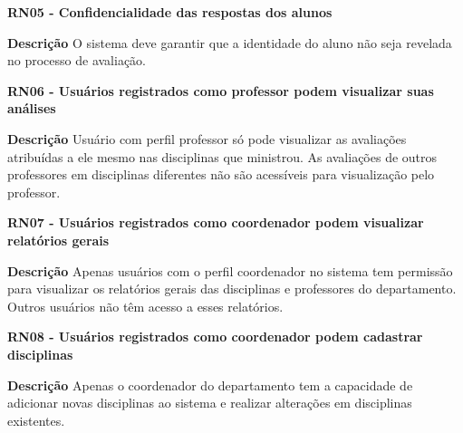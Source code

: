 \begin{description}

    \item \textbf{RN05 - Confidencialidade das respostas dos alunos} 
        \begin{description}
            \item \textbf{Descrição} O sistema deve garantir que a identidade do aluno não seja revelada no processo de avaliação.
        \end{description}
  

    \item \textbf{RN06 - Usuários registrados como professor podem visualizar suas análises} 
        \begin{description}
            \item \textbf{Descrição} Usuário com perfil professor só pode visualizar as avaliações atribuídas a ele mesmo nas disciplinas que ministrou. As avaliações de outros professores em disciplinas diferentes não são acessíveis para visualização pelo professor.
        \end{description}
    


    \item \textbf{RN07 - Usuários registrados como coordenador podem visualizar relatórios gerais} 
        \begin{description}
            \item \textbf{Descrição} Apenas usuários com o perfil coordenador no sistema tem permissão para visualizar os relatórios gerais das disciplinas e professores do departamento. Outros usuários não têm acesso a esses relatórios. 
        \end{description}
  

\item \textbf{RN08 - Usuários registrados como coordenador podem cadastrar disciplinas} 
    \begin{description}
        \item \textbf{Descrição} Apenas o coordenador do departamento tem a capacidade de adicionar novas disciplinas ao sistema e realizar alterações em disciplinas existentes.
    \end{description}
  

\end{description}
